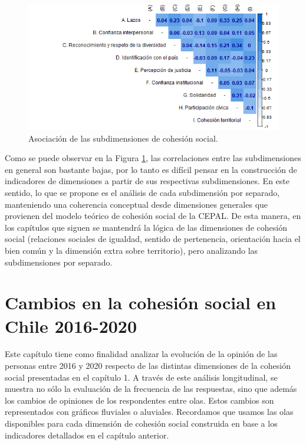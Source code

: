 \documentclass[
  12pt,
]{book}
\begin{document}
\begin{figure}[H]

{\centering \includegraphics[width=1\linewidth,height=1\textheight]{output/graphs/cohesion_social_cor} 

}

\caption{Asociación de las subdimensiones de cohesión social.}\label{fig:cohesion-social-cor}
\end{figure}

Como se puede observar en la Figura \ref{fig:cohesion-social-cor}, las correlaciones entre las subdimensiones en general son bastante bajas, por lo tanto es difícil pensar en la construcción de indicadores de dimensiones a partir de sus respectivas subdimensiones. En este sentido, lo que se propone es el análisis de cada subdimensión por separado, manteniendo una coherencia conceptual desde dimensiones generales que provienen del modelo teórico de cohesión social de la CEPAL. De esta manera, en los capítulos que siguen se mantendrá la lógica de las dimensiones de cohesión social (relaciones sociales de igualdad, sentido de pertenencia, orientación hacia el bien común y la dimensión extra sobre territorio), pero analizando las subdimensiones por separado.

\hypertarget{cambios-en-la-cohesiuxf3n-social-en-chile-2016-2020}{%
\chapter{Cambios en la cohesión social en Chile 2016-2020}\label{cambios-en-la-cohesiuxf3n-social-en-chile-2016-2020}}

Este capítulo tiene como finalidad analizar la evolución de la opinión de las personas entre 2016 y 2020 respecto de las distintas dimensiones de la cohesión social presentadas en el capítulo 1. A través de este análisis longitudinal, se muestra no sólo la evaluación de la frecuencia de las respuestas, sino que además los cambios de opiniones de los respondentes entre olas. Estos cambios son representados con gráficos fluviales o aluviales. Recordamos que usamos las olas disponibles para cada dimensión de cohesión social construida en base a los indicadores detallados en el capítulo anterior.
\end{document}
